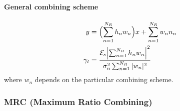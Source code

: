 \documentclass[a4paper, 10pt]{article}
\begin{document}
\paragraph{General combining scheme}
\begin{align*}
	y &= \Bigl (\sum_{n = 1}^{N_R}h_nw_n\Bigr )x + \sum_{n = 1}^{N_R}w_nn_n \\
	\gamma _t &= \frac{\mathcal{E}_s \Bigl | \sum_{n = 1}^{N_R}h_nw_n\Bigr |^2 }{\sigma _n^2 \sum_{n = 1}^{N_R}|w_n|^2}
\end{align*}
where \begin{math} w_n\end{math} depends on the particular combining scheme.
\subsubsection{MRC (Maximum Ratio Combining)}
\end{document}

